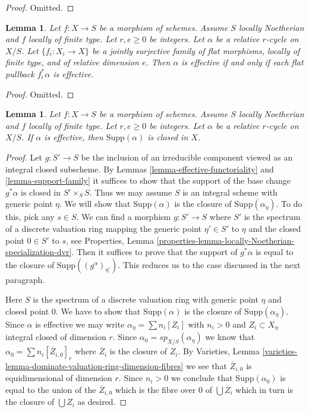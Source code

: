 \documentclass{stacks-project}
\theoremstyle{plain}
\newtheorem{lemma}[subsection]{Lemma}
\theoremstyle{definition}
\theoremstyle{remark}
\numberwithin{equation}{subsection}
\begin{document}
\begin{proof}
Omitted.
\end{proof}

\begin{lemma}
\label{lemma-effective-descent-pullbacks}
Let $f : X \to S$ be a morphism of schemes. Assume $S$ locally Noetherian
and $f$ locally of finite type. Let $r, e \geq 0$ be integers.
Let $\alpha$ be a relative $r$-cycle on $X/S$.
Let $\{f_i : X_i \to X\}$ be a jointly surjective family
of flat morphisms, locally of finite type, and of relative dimension $e$.
Then $\alpha$ is effective if and only if each flat
pullback $f_i^*\alpha$ is effective.
\end{lemma}

\begin{proof}
Omitted.
\end{proof}

\begin{lemma}
\label{lemma-effective-support-closed}
Let $f : X \to S$ be a morphism of schemes. Assume $S$ locally Noetherian
and $f$ locally of finite type. Let $r, e \geq 0$ be integers.
Let $\alpha$ be a relative $r$-cycle on $X/S$.
If $\alpha$ is effective, then $\text{Supp}(\alpha)$ is
closed in $X$.
\end{lemma}

\begin{proof}
Let $g : S' \to S$ be the inclusion of an irreducible component
viewed as an integral closed subscheme. By
Lemmas \ref{lemma-effective-functoriality} and \ref{lemma-support-family}
it suffices to show that the support of the base change
$g^*\alpha$ is closed in $S' \times_S S$.
Thus we may assume $S$ is an integral scheme with generic point
$\eta$. We will show that $\text{Supp}(\alpha)$ is the closure
of $\text{Supp}(\alpha_\eta)$. To do this, pick any $s \in S$.
We can find a morphism $g : S' \to S$ where $S'$ is the spectrum
of a discrete valuation ring mapping the generic point $\eta' \in S'$ to $\eta$
and the closed point $0 \in S'$ to $s$, see
Properties, Lemma \ref{properties-lemma-locally-Noetherian-specialization-dvr}.
Then it suffices to prove that the support of $g^*\alpha$
is equal to the closure of $\text{Supp}((g^\alpha)_{\eta'})$.
This reduces us to the case discussed in the next paragraph.

\medskip\noindent
Here $S$ is the spectrum of a discrete valuation ring with generic
point $\eta$ and closed point $0$. We have to show that
$\text{Supp}(\alpha)$ is the closure of $\text{Supp}(\alpha_\eta)$.
Since $\alpha$ is effective we may write $\alpha_\eta = \sum n_i[Z_i]$
with $n_i > 0$ and $Z_i \subset X_\eta$ integral closed of dimension $r$.
Since $\alpha_0 = sp_{X/S}(\alpha_\eta)$ we know that
$\alpha_0 = \sum n_i [\overline{Z}_{i, 0}]_r$ where $\overline{Z}_i$
is the closure of $Z_i$. By Varieties, Lemma
\ref{varieties-lemma-dominate-valuation-ring-dimension-fibres}
we see that $\overline{Z}_{i, 0}$ is equidimensional of dimension $r$.
Since $n_i > 0$ we conclude that $\text{Supp}(\alpha_0)$
is equal to the union of the $\overline{Z}_{i, 0}$ which
is the fibre over $0$ of $\bigcup \overline{Z}_i$ which
in turn is the closure of $\bigcup Z_i$ as desired.
\end{proof}
\end{document}
